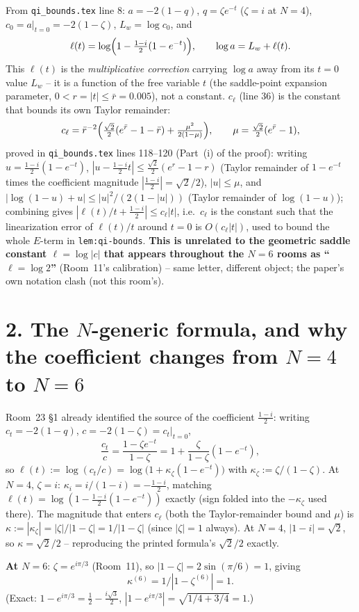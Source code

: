 \documentclass[11pt]{article}
\begin{document}
From \texttt{qi\_bounds.tex} line 8: $a=-2(1-q)$, $q=\zeta e^{-t}$ ($\zeta=i$ at $N=4$),
$c_0=a|_{t=0}=-2(1-\zeta)$, $L_w=\log c_0$, and
\[
  \ell(t)=\log\Bigl(1-\tfrac{1-i}2(1-e^{-t})\Bigr),\qquad \log a=L_w+\ell(t).
\]
This $\ell(t)$ is the \emph{multiplicative correction} carrying $\log a$ away from its $t=0$
value $L_w$ -- it is a function of the free variable $t$ (the saddle-point expansion parameter,
$0<r=|t|\le\bar r=0.005$), not a constant. $c_\ell$ (line 36) is the constant that bounds its
own Taylor remainder:
\[
  c_\ell=\bar r^{-2}\Bigl(\tfrac{\sqrt2}2(e^{\bar r}-1-\bar r)+\tfrac{\mu^2}{2(1-\mu)}\Bigr),
  \qquad \mu=\tfrac{\sqrt2}2(e^{\bar r}-1),
\]
proved in \texttt{qi\_bounds.tex} lines 118--120 (Part~(i) of the proof): writing
$u=\frac{1-i}2(1-e^{-t})$, $|u-\frac{1-i}2t|\le\frac{\sqrt2}2(e^r-1-r)$ (Taylor remainder of
$1-e^{-t}$ times the coefficient magnitude $|\frac{1-i}2|=\sqrt2/2$), $|u|\le\mu$, and
$|\log(1-u)+u|\le|u|^2/(2(1-|u|))$ (Taylor remainder of $\log(1-u)$); combining gives
$|\ell(t)/t+\frac{1-i}2|\le c_\ell|t|$, i.e.\ $c_\ell$ is the constant such that the linearization
error of $\ell(t)/t$ around $t=0$ is $O(c_\ell|t|)$, used to bound the whole $E$-term in
\texttt{lem:qi-bounds}. \textbf{This is unrelated to the geometric saddle constant $\ell=\log|c|$
that appears throughout the $N=6$ rooms as ``$\ell=\log2$''} (Room~11's calibration) -- same
letter, different object; the paper's own notation clash (not this room's).

\section*{2. The $N$-generic formula, and why the coefficient changes from $N=4$ to $N=6$}

Room~23 \S1 already identified the source of the coefficient $\frac{1-i}2$: writing
$c_t=-2(1-q)$, $c=-2(1-\zeta)=c_t|_{t=0}$,
\[
  \frac{c_t}c=\frac{1-\zeta e^{-t}}{1-\zeta}=1+\frac\zeta{1-\zeta}(1-e^{-t}),
\]
so $\ell(t):=\log(c_t/c)=\log\bigl(1+\kappa_\zeta(1-e^{-t})\bigr)$ with
$\kappa_\zeta:=\zeta/(1-\zeta)$. At $N=4$, $\zeta=i$: $\kappa_i=i/(1-i)=-\frac{1-i}2$, matching
$\ell(t)=\log(1-\frac{1-i}2(1-e^{-t}))$ exactly (sign folded into the $-\kappa_\zeta$ used there).
The magnitude that enters $c_\ell$ (both the Taylor-remainder bound and $\mu$) is
$\kappa:=|\kappa_\zeta|=|\zeta|/|1-\zeta|=1/|1-\zeta|$ (since $|\zeta|=1$ always). At $N=4$,
$|1-i|=\sqrt2$, so $\kappa=\sqrt2/2$ -- reproducing the printed formula's $\sqrt2/2$ exactly.

\textbf{At $N=6$}: $\zeta=e^{i\pi/3}$ (Room~11), so $|1-\zeta|=2\sin(\pi/6)=1$, giving
\[
  \boxed{\kappa^{(6)}=1/|1-\zeta^{(6)}|=1.}
\]
(Exact: $1-e^{i\pi/3}=\tfrac12-\tfrac{i\sqrt3}2$, $|1-e^{i\pi/3}|=\sqrt{1/4+3/4}=1$.)
\end{document}
